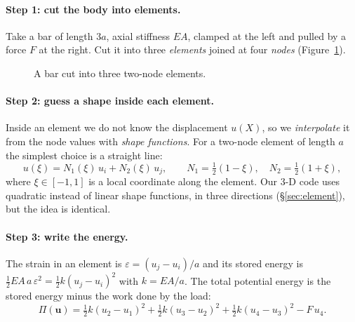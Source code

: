 \documentclass[11pt,a4paper]{article}
\numberwithin{equation}{section}
\newcommand{\uu}{\mathbf{u}}
\begin{document}
\paragraph{Step 1: cut the body into elements.}
Take a bar of length $3a$, axial stiffness $EA$, clamped at the left and pulled by a
force $F$ at the right. Cut it into three \emph{elements} joined at four
\emph{nodes} (Figure~\ref{fig:bar}).

\begin{figure}[H]
\centering
{}
\caption{A bar cut into three two-node elements.}
\label{fig:bar}
\end{figure}

\paragraph{Step 2: guess a shape inside each element.}
Inside an element we do not know the displacement $u(X)$, so we \emph{interpolate}
it from the node values with \emph{shape functions}. For a two-node element of length
$a$ the simplest choice is a straight line:
\begin{equation}
u(\xi) = N_1(\xi)\,u_i + N_2(\xi)\,u_j,\qquad N_1=\tfrac12(1-\xi),\quad N_2=\tfrac12(1+\xi),
\end{equation}
where $\xi\in[-1,1]$ is a local coordinate along the element. Our 3-D code uses
quadratic instead of linear shape functions, in three directions (\S\ref{sec:element}),
but the idea is identical.

\paragraph{Step 3: write the energy.}
The strain in an element is $\varepsilon=(u_j-u_i)/a$ and its stored energy is
$\tfrac12 EA\,a\,\varepsilon^2=\tfrac12 k(u_j-u_i)^2$ with $k=EA/a$. The total
potential energy is the stored energy minus the work done by the load:
\begin{equation}
\Pi(\uu)=\tfrac12 k(u_2-u_1)^2+\tfrac12 k(u_3-u_2)^2+\tfrac12 k(u_4-u_3)^2-F\,u_4 .
\end{equation}
\end{document}

